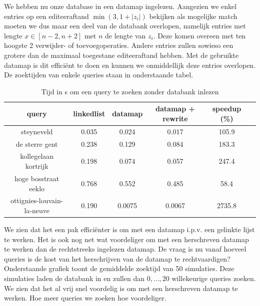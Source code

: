 \documentclass[11pt]{article}
\begin{document}
We hebben nu onze database in een datamap ingelezen. Aangezien we enkel entries op een editeeraftand $\min(3,1+|z_i|)$ bekijken als mogelijke match moeten we dus maar een deel van de databank overlopen, namelijk entries met lengte $x \in [n-2, n+2]$ met $n$ de lengte van $z_i$. Deze komen overeen met ten hoogste 2 verwijder- of toevoegoperaties. Andere entries zullen sowieso een grotere dan de maximaal toegestane editeeraftand hebben. Met de gebruikte datamap is dit efficiënt te doen en kunnen we onmiddellijk deze entries overlopen. De zoektijden van enkele queries staan in onderstaande tabel.\\
\begin{table}[H]
        \centering
        \begin{tabular}{ |c|c|c|c|c|c| }
                \hline
                query & linkedlist & datamap & datamap + rewrite & speedup (\%)\\
                \hline
                steyneveld                 & 0.035 & 0.024 & 0.017 & 105.9\\
                de sterre gent             & 0.238 & 0.129 & 0.084 & 183.3\\
                kollegelaan kortrijk       & 0.198 & 0.074 & 0.057 & 247.4\\ 
                hoge bosstraat eeklo       & 0.768 & 0.552 & 0.485 & 58.4\\
                ottignies-louvain-la-neuve & 0.190 & 0.0075 & 0.0067 & 2735.8\\

                \hline
        \end{tabular}
        \caption{Tijd in s om een query te zoeken zonder databank inlezen}
        \label{searchtime}
\end{table}

We zien dat het een pak efficiënter is om met een datamap i.p.v. een gelinkte lijst te werken. Het is ook nog net wat voordeliger om met een herschreven datamap te werken dan de rechtstreeks ingelezen datamap. De vraag is nu vanaf hoeveel queries is de kost van het herschrijven van de datamap te rechtvaardigen? Onderstaande grafiek toont de gemiddelde zoektijd van 50 simulaties. Deze simulaties laden de databank in en zullen dan $0,...,20$ willekeurige queries zoeken. We zien dat het al vrij snel voordelig is om met een herschreven datamap te werken. Hoe meer queries we zoeken hoe voordeliger.
\end{document}
